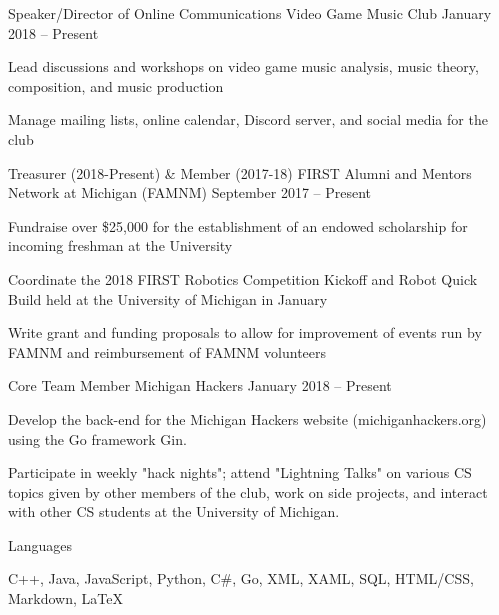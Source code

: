 \documentclass[]{awesome-cv}
\begin{document}
	\vspace{-5mm}

\vspace{-2mm}
\vspace{-2mm}
	\cventry
	{Speaker/Director of Online Communications}
	{Video Game Music Club}
	{}
	{January 2018 – Present}
	{\begin{cvitems}
		\item {Lead discussions and workshops on video game music analysis, music theory, composition, and music production}
		\item {Manage mailing lists, online calendar, Discord server, and social media for the club}
		\end{cvitems}}

	\vspace{-4mm}
	\cventry
	{Treasurer (2018-Present) \& Member (2017-18)}
	{FIRST Alumni and Mentors Network at Michigan (FAMNM)}
	{}
	{September 2017 – Present}
	{\begin{cvitems}
		\item {Fundraise over \$25,000 for the establishment of an endowed scholarship for incoming freshman at the University}
		\item {Coordinate the 2018 FIRST Robotics Competition Kickoff and Robot Quick Build held at the University of Michigan in January}
		\item {Write grant and funding proposals to allow for improvement of events run by FAMNM and reimbursement of FAMNM volunteers}
		\end{cvitems}}
	
	\vspace{-4mm}
	\cventry
	{Core Team Member}
	{Michigan Hackers}
	{}
	{January 2018 – Present}
	{\begin{cvitems}
		\item {Develop the back-end for the Michigan Hackers website (michiganhackers.org) using the Go framework Gin.}
		\item {Participate in weekly "hack nights"; attend "Lightning Talks" on various CS topics given by other members of the club, work on side projects, and interact with other CS students at the University of Michigan.}
		\end{cvitems}}
	\vspace{-4mm}

\vspace{-1mm}
\vspace{-2mm}
	\cventry
	{}
	{Languages}
	{}
	{}
	{\begin{cvitems}
		\vspace{-7mm}
		\item {C++, Java, JavaScript, Python, C\#, Go, XML, XAML, SQL, HTML/CSS, Markdown, LaTeX}
		\end{cvitems}}
\end{document}
